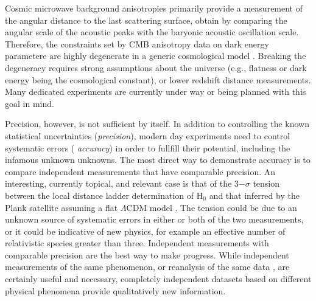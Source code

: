 Cosmic microwave background anisotropies primarily provide a
measurement of the angular distance to the last scattering surface,
obtain by comparing the angular scale of the acoustic peaks with the
baryonic acoustic oscillation scale. Therefore, the constraints set by
CMB anisotropy data on dark energy parametere are highly degenerate in
a generic cosmological model
\citep[e.g.,][]{Pla15}. Breaking the degeneracy requires strong
assumptions about the universe (e.g., flatness or dark energy being
the cosmological constant), or lower redshift distance
measurements. Many dedicated experiments are currently under way or
being planned with this goal in mind.



Precision, however, is not sufficient by itself. In addition to
controlling the known statistical uncertainties ({\it precision}),
modern day experiments need to control systematic errors ({\it
accuracy}) in order to fullfill their potential, including the
infamous unknown unknowns. The most direct way to demonstrate accuracy
is to compare independent measurements that have comparable precision. An
interesting, currently topical, and relevant case is that of the 3$-\sigma$ tension
between the local distance ladder determination of H$_0$
\citep{Rie++16} and that inferred by the Plank satellite assuming a
flat $\Lambda$CDM model \citep{Pla15}. The tension could be due to an
unknown source of systematic errors in either or both of the two measurements, or
it could be indicative of new physics, for example an effective number of
relativistic species greater than three. Independent measurements with
comparable precision are the best way to make progress.
While independent measurements of the same phenomenon, or reanalysis of the
same data \citep{Efs14,SFH15}, are certainly useful and necessary,
completely independent datasets based on different physical phenomena
provide qualitatively new information.

